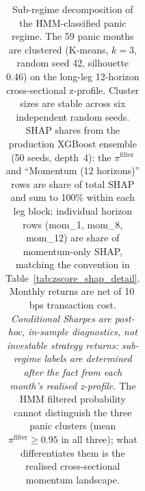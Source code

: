 \begin{table}[H]
\begin{tabular}{l rrrr}
\bottomrule
\end{tabular}
\caption{Sub-regime decomposition of the HMM-classified panic regime. The 59 panic months are clustered (K-means, $k=3$, random seed 42, silhouette 0.46) on the long-leg 12-horizon cross-sectional z-profile. Cluster sizes are stable across six independent random seeds. SHAP shares from the production XGBoost ensemble (50 seeds, depth~4): the $\pi^{\text{filter}}$ and ``Momentum (12 horizons)'' rows are share of total SHAP and sum to 100\% within each leg block; individual horizon rows (mom\_1, mom\_8, mom\_12) are share of momentum-only SHAP, matching the convention in Table~\ref{tab:zscore_shap_detail}. Monthly returns are net of 10\,bps transaction cost. \emph{Conditional Sharpes are post-hoc, in-sample diagnostics, not investable strategy returns: sub-regime labels are determined after the fact from each month's realised z-profile.} The HMM filtered probability cannot distinguish the three panic clusters (mean $\pi^{\text{filter}} \geq 0.95$ in all three); what differentiates them is the realised cross-sectional momentum landscape.}
\label{tab:zscore_subregime}
\end{table}
